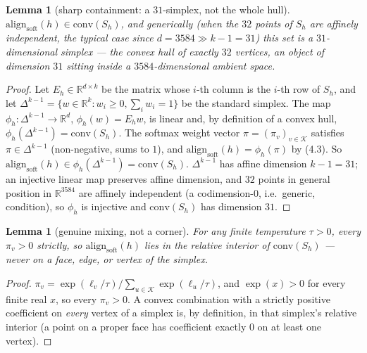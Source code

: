 \documentclass[11pt]{article}
\newtheorem{lemma}[theorem]{Lemma}
\theoremstyle{definition}
\begin{document}
\begin{lemma}[sharp containment: a $31$-simplex, not the whole hull]
\label{lem:hull-sharp}
$\mathrm{align}_{\mathrm{soft}}(h) \in \mathrm{conv}(S_h)$, and generically (when the $32$ points of $S_h$ are affinely independent, the typical case since $d=3584\gg k-1=31$) this set is a $31$-dimensional simplex --- the convex hull of exactly $32$ vertices, an object of dimension $31$ sitting inside a $3584$-dimensional ambient space.
\end{lemma}
\begin{proof}
Let $E_h\in\mathbb{R}^{d\times k}$ be the matrix whose $i$-th column is the $i$-th row of $S_h$, and let $\Delta^{k-1}=\{w\in\mathbb{R}^k: w_i\ge0,\sum_iw_i=1\}$ be the standard simplex. The map $\phi_h:\Delta^{k-1}\to\mathbb{R}^d$, $\phi_h(w) = E_hw$, is linear and, by definition of a convex hull, $\phi_h(\Delta^{k-1}) = \mathrm{conv}(S_h)$. The softmax weight vector $\pi=(\pi_v)_{v\in\mathcal{K}}$ satisfies $\pi\in\Delta^{k-1}$ (non-negative, sums to $1$), and $\mathrm{align}_{\mathrm{soft}}(h) = \phi_h(\pi)$ by (4.3). So $\mathrm{align}_{\mathrm{soft}}(h)\in\phi_h(\Delta^{k-1})=\mathrm{conv}(S_h)$. $\Delta^{k-1}$ has affine dimension $k-1=31$; an injective linear map preserves affine dimension, and $32$ points in general position in $\mathbb{R}^{3584}$ are affinely independent (a codimension-$0$, i.e.\ generic, condition), so $\phi_h$ is injective and $\mathrm{conv}(S_h)$ has dimension $31$.
\end{proof}

\begin{lemma}[genuine mixing, not a corner]
\label{lem:hull-interior}
For any finite temperature $\tau>0$, every $\pi_v>0$ strictly, so $\mathrm{align}_{\mathrm{soft}}(h)$ lies in the \emph{relative interior} of $\mathrm{conv}(S_h)$ --- never on a face, edge, or vertex of the simplex.
\end{lemma}
\begin{proof}
$\pi_v = \exp(\ell_v/\tau)/\sum_{u\in\mathcal{K}}\exp(\ell_u/\tau)$, and $\exp(x)>0$ for every finite real $x$, so every $\pi_v>0$. A convex combination with a strictly positive coefficient on \emph{every} vertex of a simplex is, by definition, in that simplex's relative interior (a point on a proper face has coefficient exactly $0$ on at least one vertex).
\end{proof}
\end{document}
